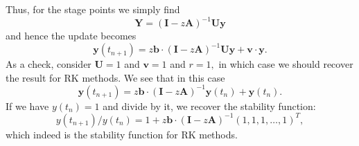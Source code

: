\documentclass[10pt,a4paper]{article}
\newcommand{\bvec}[1]{\mathbf{#1}}
\begin{document}
Thus, for the stage points we simply find
\begin{equation*}
  \bvec{Y} = (\bvec{I} - z\bvec{A})^{-1}\bvec{Uy}
\end{equation*}
and hence the update becomes
\begin{equation*}
  \bvec{y}(t_{n+1}) = z \bvec{b} \cdot (\bvec{I} - z\bvec{A})^{-1}\bvec{Uy} + \bvec{v}\cdot\bvec{y}.
\end{equation*}
As a check, consider $\bvec{U}=1$ and $\bvec{v} = 1$ and $r=1,$ in which case we should recover the result for RK methods.
We see that in this case
\begin{equation*}
  \bvec{y}(t_{n+1}) = z \bvec{b} \cdot (\bvec{I} - z\bvec{A})^{-1}\bvec{y}(t_n) + \bvec{y}(t_n).
\end{equation*}
If we have $y(t_n) = 1$ and divide by it, we recover the stability function:
\begin{equation*}
  y(t_{n+1})/y(t_n) = 1 + z \bvec{b} \cdot (\bvec{I} - z\bvec{A})^{-1}(1,1,1,\hdots,1)^T,
\end{equation*}
which indeed is the stability function for RK methods.
\end{document}
